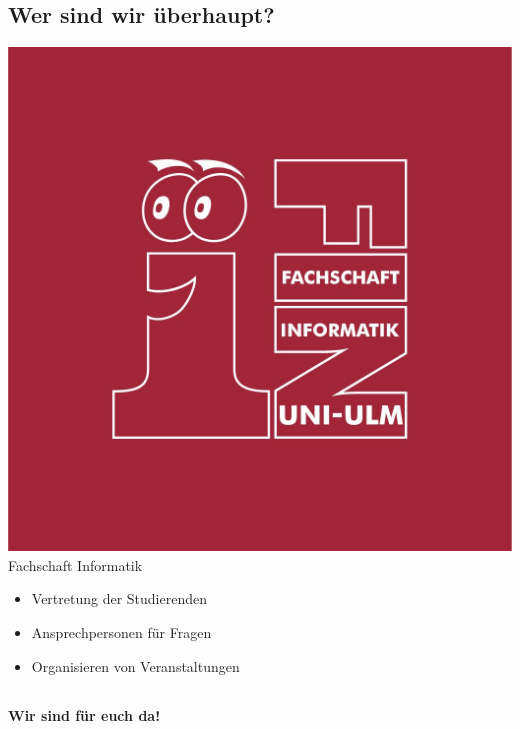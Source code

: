 \documentclass[
	aspectratio=169, %
	11pt %
]{beamer}
\begin{document}
\subsection{Wer sind wir überhaupt?}
\begin{frame}{\insertsubsection}
	\begin{fancycolumns}[columns=2]
			\includegraphics[width=\linewidth]{assets/FIN_Logo.jpg}
		\nextcolumn
			\Large Fachschaft Informatik
			\begin{itemize}
				\item Vertretung der Studierenden
				\item Ansprechpersonen für Fragen
				\item Organisieren von Veranstaltungen 
			\end{itemize}
	\end{fancycolumns}
\end{frame}

\subsection{}
\begin{frame}{\insertsubsection}
	\begin{center}
		\Huge\textbf{Wir sind für euch da!}
	\end{center}
\end{frame}
\end{document}
